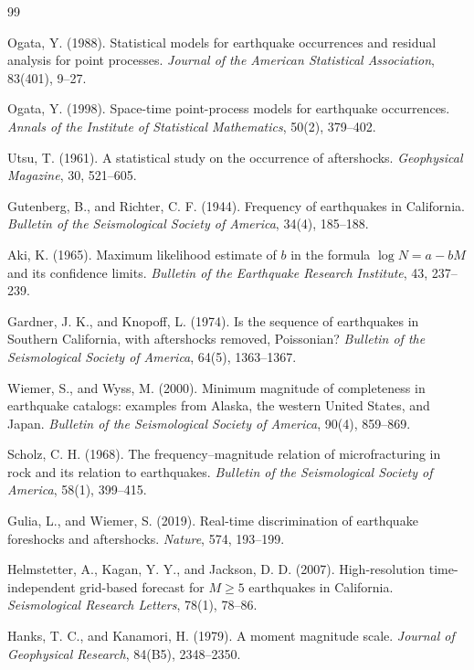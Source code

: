 \documentclass[11pt,a4paper]{article}
\begin{document}

\begin{thebibliography}{99}

 Ogata, Y. (1988). Statistical models for earthquake
occurrences and residual analysis for point processes. \emph{Journal of the
American Statistical Association}, 83(401), 9--27.

 Ogata, Y. (1998). Space-time point-process models for
earthquake occurrences. \emph{Annals of the Institute of Statistical
Mathematics}, 50(2), 379--402.

 Utsu, T. (1961). A statistical study on the occurrence of
aftershocks. \emph{Geophysical Magazine}, 30, 521--605.

 Gutenberg, B., and Richter, C. F. (1944). Frequency
of earthquakes in California. \emph{Bulletin of the Seismological Society of
America}, 34(4), 185--188.

 Aki, K. (1965). Maximum likelihood estimate of $b$ in the
formula $\log N=a-bM$ and its confidence limits. \emph{Bulletin of the
Earthquake Research Institute}, 43, 237--239.

 Gardner, J. K., and Knopoff, L. (1974). Is the sequence
of earthquakes in Southern California, with aftershocks removed, Poissonian?
\emph{Bulletin of the Seismological Society of America}, 64(5), 1363--1367.

 Wiemer, S., and Wyss, M. (2000). Minimum magnitude of
completeness in earthquake catalogs: examples from Alaska, the western
United States, and Japan. \emph{Bulletin of the Seismological Society of
America}, 90(4), 859--869.

 Scholz, C. H. (1968). The frequency--magnitude relation
of microfracturing in rock and its relation to earthquakes. \emph{Bulletin
of the Seismological Society of America}, 58(1), 399--415.

 Gulia, L., and Wiemer, S. (2019). Real-time
discrimination of earthquake foreshocks and aftershocks. \emph{Nature}, 574,
193--199.

 Helmstetter, A., Kagan, Y. Y., and Jackson, D. D.
(2007). High-resolution time-independent grid-based forecast for $M\ge5$
earthquakes in California. \emph{Seismological Research Letters}, 78(1),
78--86.

 Hanks, T. C., and Kanamori, H. (1979). A moment magnitude
scale. \emph{Journal of Geophysical Research}, 84(B5), 2348--2350.


\end{thebibliography}
\end{document}
